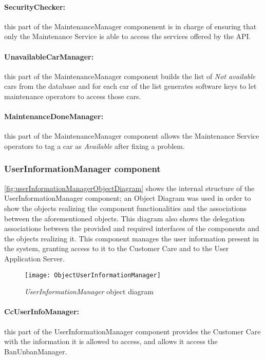 \paragraph{SecurityChecker:} this part of the MaintenanceManager componenent is in charge of ensuring that only the Maintenance Service is able to access the services offered by the API.
\paragraph{UnavailableCarManager:} this part of the MaintenanceManager component builds the list of \emph{Not available} cars from the database and for each car of the list generates software keys to let maintenance operators to access those cars.
\paragraph{MaintenanceDoneManager:} this part of the MaintenanceManager component allows the Maintenance Service operators to tag a car as \emph{Available} after fixing a problem.

\subsubsection{UserInformationManager component}
\autoref{fig:userInformationManagerObjectDiagram} shows the internal structure of the UserInformationManager component; an Object Diagram was used in order to show the objects realizing the component functionalities and the associations between the aforementioned objects. This diagram also shows the delegation associations between the provided and required interfaces of the components and the objects realizing it.
This component manages the user information present in the system, granting access to it to the Customer Care and to the User Application Server.
\begin{figure}[h!]
	\centering
	\texttt{[image: ObjectUserInformationManager]}
	\caption{
		\label{fig:userInformationManagerObjectDiagram} 
		\emph{UserInformationManager} object diagram
	}
\end{figure}

\paragraph{CcUserInfoManager:} this part of the UserInformationManager component provides the Customer Care with the information it is allowed to access, and allows it access the BanUnbanManager.
